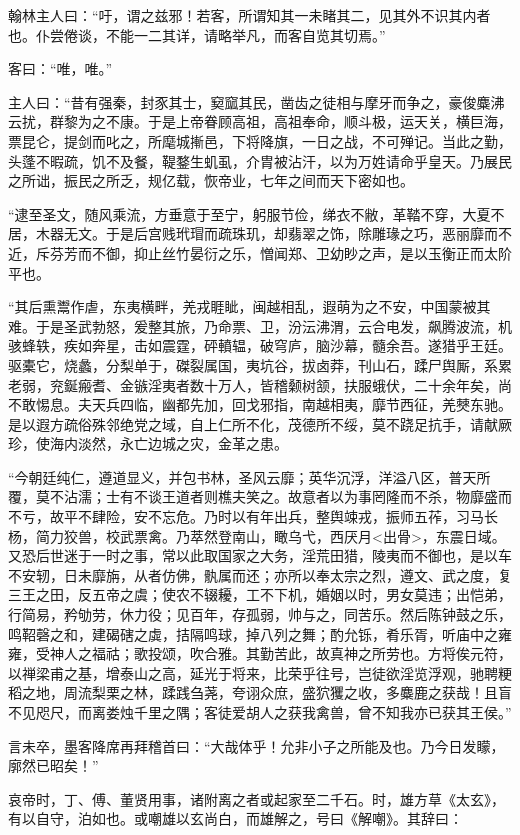 \documentclass[]{article}
\begin{document}
翰林主人曰：``吁，谓之兹邪！若客，所谓知其一未睹其二，见其外不识其内者也。仆尝倦谈，不能一二其详，请略举凡，而客自览其切焉。''

客曰：``唯，唯。''

主人曰：``昔有强秦，封豕其士，窫窳其民，凿齿之徒相与摩牙而争之，豪俊麋沸云扰，群黎为之不康。于是上帝眷顾高祖，高祖奉命，顺斗极，运天关，横巨海，票昆仑，提剑而叱之，所麾城摲邑，下将降旗，一日之战，不可殚记。当此之勤，头蓬不暇疏，饥不及餐，鞮鍪生虮虱，介胄被沾汗，以为万姓请命乎皇天。乃展民之所诎，振民之所乏，规亿载，恢帝业，七年之间而天下密如也。

``逮至圣文，随风乘流，方垂意于至宁，躬服节俭，绨衣不敝，革鞜不穿，大夏不居，木器无文。于是后宫贱玳瑁而疏珠玑，却翡翠之饰，除雕瑑之巧，恶丽靡而不近，斥芬芳而不御，抑止丝竹晏衍之乐，憎闻郑、卫幼眇之声，是以玉衡正而太阶平也。

``其后熏鬻作虐，东夷横畔，羌戎睚眦，闽越相乱，遐萌为之不安，中国蒙被其难。于是圣武勃怒，爰整其旅，乃命票、卫，汾沄沸渭，云合电发，飙腾波流，机骇蜂轶，疾如奔星，击如震霆，砰轒辒，破穹庐，脑沙幕，髓余吾。遂猎乎王廷。驱橐它，烧蠡，分梨单于，磔裂属国，夷坑谷，拔卤莽，刊山石，蹂尸舆厮，系累老弱，兖鋋瘢耆、金镞淫夷者数十万人，皆稽颡树颔，扶服蛾伏，二十余年矣，尚不敢惕息。夫天兵四临，幽都先加，回戈邪指，南越相夷，靡节西征，羌僰东驰。是以遐方疏俗殊邻绝党之域，自上仁所不化，茂德所不绥，莫不跷足抗手，请献厥珍，使海内淡然，永亡边城之灾，金革之患。

``今朝廷纯仁，遵道显义，并包书林，圣风云靡；英华沉浮，洋溢八区，普天所覆，莫不沾濡；士有不谈王道者则樵夫笑之。故意者以为事罔隆而不杀，物靡盛而不亏，故平不肆险，安不忘危。乃时以有年出兵，整舆竦戎，振师五莋，习马长杨，简力狡兽，校武票禽。乃萃然登南山，瞰乌弋，西厌月\textless{}出骨\textgreater{}，东震日域。又恐后世迷于一时之事，常以此取国家之大务，淫荒田猎，陵夷而不御也，是以车不安轫，日未靡旃，从者仿佛，骫属而还；亦所以奉太宗之烈，遵文、武之度，复三王之田，反五帝之虞；使农不辍耰，工不下机，婚姻以时，男女莫违；出恺弟，行简易，矜劬劳，休力役；见百年，存孤弱，帅与之，同苦乐。然后陈钟鼓之乐，鸣鞀磬之和，建碣磍之虡，拮隔鸣球，掉八列之舞；酌允铄，肴乐胥，听庙中之雍雍，受神人之福祜；歌投颂，吹合雅。其勤苦此，故真神之所劳也。方将俟元符，以禅梁甫之基，增泰山之高，延光于将来，比荣乎往号，岂徒欲淫览浮观，驰聘粳稻之地，周流梨栗之林，蹂践刍荛，夸诩众庶，盛狖玃之收，多麋鹿之获哉！且盲不见咫尺，而离娄烛千里之隅；客徒爱胡人之获我禽兽，曾不知我亦已获其王侯。''

言未卒，墨客降席再拜稽首曰：``大哉体乎！允非小子之所能及也。乃今日发矇，廓然已昭矣！''

哀帝时，丁、傅、董贤用事，诸附离之者或起家至二千石。时，雄方草《太玄》，有以自守，泊如也。或嘲雄以玄尚白，而雄解之，号曰《解嘲》。其辞曰：
\end{document}

